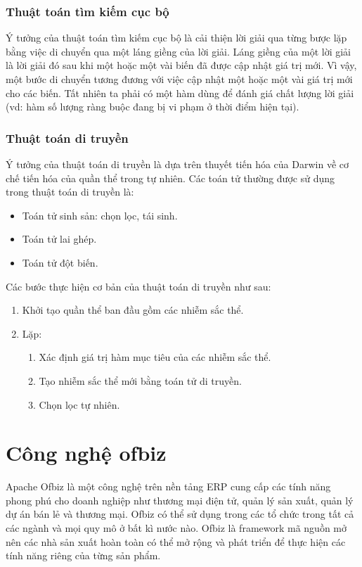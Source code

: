 \documentclass[a4paper,12pt]{report}
\begin{document}
\subsubsection{Thuật toán tìm kiếm cục bộ}
Ý tưởng của thuật toán tìm kiếm cục bộ là cải thiện lời giải qua từng bược lặp bằng việc di chuyển qua một láng giềng của lời giải. Láng giềng của một lời giải là lời giải đó sau khi một hoặc một vài biến đã được cập nhật giá trị mới. Vì vậy, một bước di chuyển tương đương với việc cập nhật một hoặc một vài giá trị mới cho các biến. Tất nhiên ta phải có một hàm dùng để đánh giá chất lượng lời giải (vd: hàm số lượng ràng buộc đang bị vi phạm ở thời điểm hiện tại). 

\subsubsection{Thuật toán di truyền}
Ý tưởng của thuật toán di truyền là dựa trên thuyết tiến hóa của Darwin về cơ chế tiến hóa của quần thể trong tự nhiên. Các toán tử thường được sử dụng trong thuật toán di truyền là:
\begin{itemize}
\item Toán tử sinh sản: chọn lọc, tái sinh.
\item Toán tử lai ghép.
\item Toán tử đột biến.
\end{itemize} 
Các bước thực hiện cơ bản của thuật toán di truyền như sau:
\begin{enumerate}
\item Khởi tạo quần thể ban đầu gồm các nhiễm sắc thể.
\item Lặp:
\begin{enumerate}

\item Xác định giá trị hàm mục tiêu của các nhiễm sắc thể.
\item Tạo nhiễm sắc thể mới bằng toán tử di truyền.
\item Chọn lọc tự nhiên.\cite{GA}

\end{enumerate}
\end{enumerate}
\section{Công nghệ ofbiz}
\label{section:ofbiz}
Apache Ofbiz là một công nghệ trên nền tảng \ac{ERP} cung cấp các tính năng phong phú cho doanh nghiệp như thương mại điện tử, quản lý sản xuất,  quản lý dự án bán lẻ và thương mại. Ofbiz có thể sử dụng trong các tổ chức trong tất cả các ngành và mọi quy mô ở bất kì nước nào. Ofbiz là framework mã nguồn mở nên các nhà sản xuất hoàn toàn có thể mở rộng và phát triển để thực hiện các tính năng riêng của từng sản phẩm. \\
\end{document}
